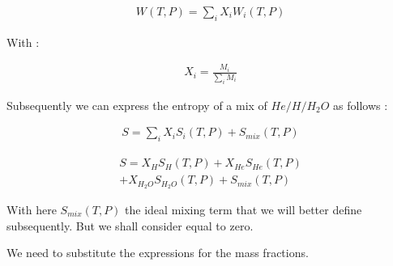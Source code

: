 \begin{align} 
    W(T,P) = \sum_{i} X_{i} W_{i}(T,P)
    \label{eq:extensive_qty}
\end{align}

With :

\begin{align} 
    X_{i} = \frac{M_i}{\sum_{i}M_{i}}
    \label{eq:mass_fraction}
\end{align}

Subsequently we can express the entropy of a mix of $He/H/H_2O$ as follows :

\begin{align} 
    S = \sum_{i} X_{i} S_{i}(T,P) + S_{mix}(T,P)
    \label{eq:entropy_mix1}
\end{align}

\begin{align} 
    S = X_{H} S_{H}(T,P) + X_{He} S_{He}(T,P) \nonumber \\ 
    + X_{H_2O} S_{H_2O}(T,P) + S_{mix}(T,P)
    \label{eq:entropy_mix2}
\end{align}

With here $S_{mix}(T,P)$ the ideal mixing term that we will better define subsequently. But we shall consider equal to zero.

We need to substitute the expressions for the mass fractions. 